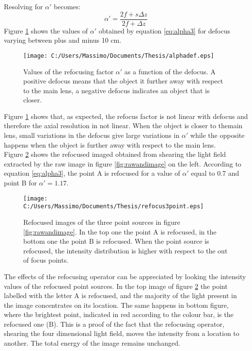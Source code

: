 Resolving for $ \alpha'$ becomes:
\begin{equation}
\label{eq:alpha3}
 \alpha' = \dfrac{2f+s\Delta z}{2f+\Delta z} 	
\end{equation}
Figure \ref{fig:alpha} shows the values of $ \alpha'$ obtained by equation \ref{eq:alpha3} for defocus varying between plus and minus 10 cm.
\begin{figure}[H]
	\centering
	\texttt{[image: C:/Users/Massimo/Documents/Thesis/alphadef.eps]}
	\caption{\label{fig:alpha} Values of the refocusing factor $ \alpha'$ as a function of the defocus. A positive defocus means that the object it further away with respect to the main lens, a negative defocus indicates an object that is closer. }
\end{figure}
Figure \ref{fig:alpha} shows that, as expected, the refocus factor is not linear with defocus and therefore the axial resolution in not linear. When the object is closer to themain lens, small variations in the defocus give large variations in $ \alpha'$ while the opposite happens when the object is further away with respect to the main lens. \\
Figure \ref{fig:refocus} shows the refocused imaged obtained from shearing the light field extracted by the raw image in figure \ref{fig:rawandimage} on the left. According to equation \ref{eq:alpha3}, the point A is refocused for a value of $ \alpha'$ equal to 0.7 and point B for $ \alpha' = 1.17$.
\begin{figure}[H]
	\centering
	\texttt{[image: C:/Users/Massimo/Documents/Thesis/refocus3point.eps]}
	\caption{\label{fig:refocus} Refocused images of the three point sources in figure \ref{fig:rawandimage}. In the top one the point A is refocused, in the bottom one the point B is refocused. When the point source is refocused, the intensity distribution is higher with respect to the out of focus points. }
\end{figure}
The effects of the refocusing operator can be appreciated by looking the intensity values of the refocused point sources. In the top image of figure \ref{fig:refocus} the point labelled with the letter A is refocused, and the majority of the light present in the image concentrates on its location. The same happens in bottom figure, where the brightest point, indicated in red according to the colour bar, is the refocused one (B). This is a proof of the fact that the refocusing operator, shearing the four dimensional light field, moves the intensity from a location to another. The total energy of the image remains unchanged. 
\\
